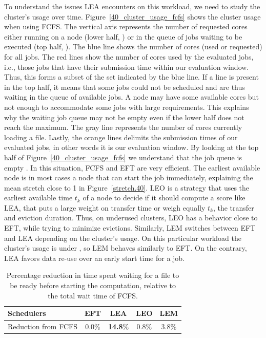 \documentclass[sigconf,review,anonymous]{acmart}
\newcommand{\rev}[1]{{\color{black}{#1}}}
\begin{document}
To understand the issues LEA encounters on this workload, we need to study the cluster's usage over time.
Figure~\ref{40_cluster_usage_fcfs} shows the cluster usage when using FCFS.
The vertical axis represents the number of requested cores either running on a
node (lower half, \rev{the maximum is the total number of cores on our cluster: 9720}) or in the queue of jobs waiting to be executed (top
half, \rev{where the number of requested cores can be much higher than the cluster's capability}).
The blue line shows the number of cores (used or requested) for all jobs.
The red lines show the number of cores used by the evaluated jobs, i.e.,
those jobs that have their submission time within our evaluation window. Thus, this forms a subset
of the set indicated by the blue line.
If a line is present in the top half, it means that some jobs could not be scheduled
and are thus waiting in the queue of available jobs. 
A node may have some available cores but not enough to accommodate some jobs with large requirements.
This explains why the waiting job queue may not be empty even if the lower half does not reach the maximum.
The gray line represents the number of cores currently loading a file.
Lastly, the orange lines delimits the submission times of our 
evaluated jobs, in other words it is our evaluation window.
By looking at the top half of Figure~\ref{40_cluster_usage_fcfs}
we understand that the job queue is empty \rev{for more than half of the evaluation window}.
In this situation, FCFS and EFT are very efficient. The earliest available node is in
most cases a node that can start the job immediately, explaining the mean stretch close to 1 in Figure~\ref{stretch.40}.
LEO is a strategy that uses the earliest available time $t_k$ of a node to decide if it should compute a score like LEA,
that puts a large weight on transfer time
or weigh equally $t_k$, the transfer and eviction duration. 
Thus, on underused clusters, LEO has a behavior close to EFT, while trying to minimize evictions.
Similarly, LEM switches between EFT and LEA depending on the cluster's usage.
On this particular workload the cluster's usage is under \rev{100\% more than half the time}, so LEM behaves similarly to EFT.
On the contrary, LEA favors data re-use over an early start time for a job.
\begin{table}
\begin{tabular}{ l c c c c }
  \toprule
  Schedulers & EFT & \textbf{LEA} & LEO & LEM \\
  \midrule
  Reduction from FCFS & 0.0\% & \textbf{14.8}\% & 0.8\% & 3.8\% \\ %
  \bottomrule
\end{tabular}
\caption{Percentage reduction in time spent waiting for a file to be ready before starting the computation, relative to the total wait time of FCFS.}\label{tab.40}
\end{table}
\end{document}
